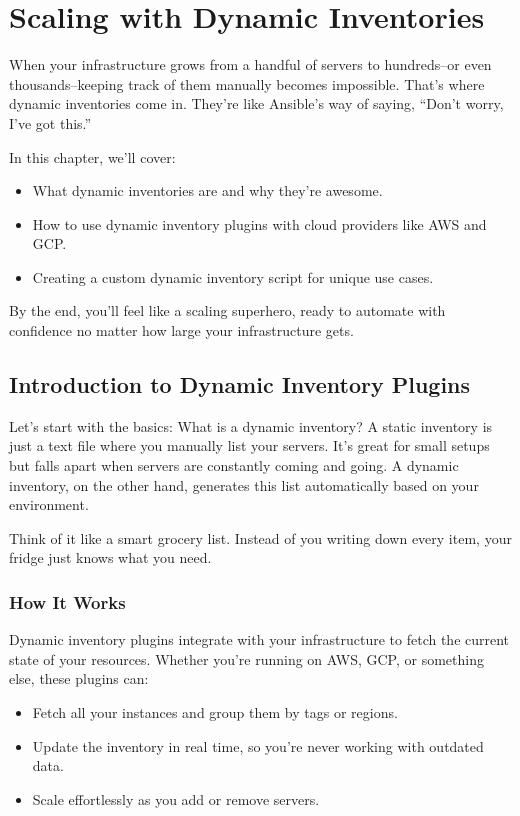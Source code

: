 \chapter{Scaling with Dynamic Inventories}

When your infrastructure grows from a handful of servers to hundreds--or even thousands--keeping track of them manually becomes impossible. That's where dynamic inventories come in. They're like Ansible's way of saying, “Don't worry, I've got this.”

In this chapter, we'll cover:
\begin{itemize}
    \item What dynamic inventories are and why they're awesome.
    \item How to use dynamic inventory plugins with cloud providers like AWS and GCP.
    \item Creating a custom dynamic inventory script for unique use cases.
\end{itemize}

By the end, you'll feel like a scaling superhero, ready to automate with confidence no matter how large your infrastructure gets.


\section{Introduction to Dynamic Inventory Plugins}

Let's start with the basics: What is a dynamic inventory? A static inventory is just a text file where you manually list your servers. It's great for small setups but falls apart when servers are constantly coming and going. A dynamic inventory, on the other hand, generates this list automatically based on your environment.

Think of it like a smart grocery list. Instead of you writing down every item, your fridge just knows what you need.

\subsection{How It Works}

Dynamic inventory plugins integrate with your infrastructure to fetch the current state of your resources. Whether you're running on AWS, GCP, or something else, these plugins can:
\begin{itemize}
    \item Fetch all your instances and group them by tags or regions.
    \item Update the inventory in real time, so you're never working with outdated data.
    \item Scale effortlessly as you add or remove servers.
\end{itemize}

